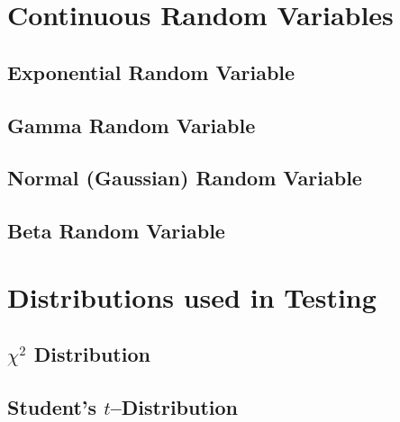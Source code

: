 \documentclass[
]{krantz}
\begin{document}
\hypertarget{continuous-random-variables}{%
\section{Continuous Random Variables}\label{continuous-random-variables}}

\hypertarget{exponential-random-variable}{%
\subsection{Exponential Random Variable}\label{exponential-random-variable}}

\hypertarget{gamma-random-variable}{%
\subsection{Gamma Random Variable}\label{gamma-random-variable}}

\hypertarget{normal-gaussian-random-variable}{%
\subsection{Normal (Gaussian) Random Variable}\label{normal-gaussian-random-variable}}

\hypertarget{beta-random-variable}{%
\subsection{Beta Random Variable}\label{beta-random-variable}}

\hypertarget{distributions-used-in-testing}{%
\section{Distributions used in Testing}\label{distributions-used-in-testing}}

\hypertarget{chi2-distribution}{%
\subsection{\texorpdfstring{\(\chi^2\) Distribution}{\textbackslash chi\^{}2 Distribution}}\label{chi2-distribution}}

\hypertarget{students-tdistribution}{%
\subsection{\texorpdfstring{Student's \(t\)--Distribution}{Student's t--Distribution}}\label{students-tdistribution}}
\end{document}
